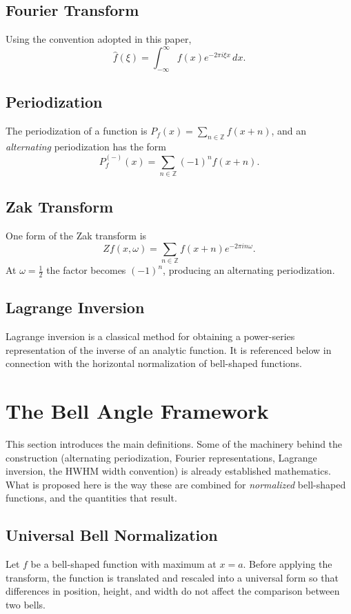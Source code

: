 \documentclass[11pt]{article}
\theoremstyle{definition}
\theoremstyle{plain}
\theoremstyle{remark}
\begin{document}
\subsection{Fourier Transform}
Using the convention adopted in this paper,
\[
\widehat{f}(\xi)=\int_{-\infty}^{\infty}f(x)e^{-2\pi i\xi x}\,dx .
\]

\subsection{Periodization}
The periodization of a function is $P_f(x)=\sum_{n\in\mathbb Z}f(x+n)$, and an
\emph{alternating} periodization has the form
\[
P_f^{(-)}(x)=\sum_{n\in\mathbb Z}(-1)^n f(x+n).
\]

\subsection{Zak Transform}
One form of the Zak transform is
\[
Zf(x,\omega)=\sum_{n\in\mathbb Z}f(x+n)e^{-2\pi i n\omega}.
\]
At $\omega=\frac12$ the factor becomes $(-1)^n$, producing an alternating periodization.

\subsection{Lagrange Inversion}
Lagrange inversion is a classical method for obtaining a power-series representation of
the inverse of an analytic function. It is referenced below in connection with the
horizontal normalization of bell-shaped functions.

 
\section{The Bell Angle Framework}
 

This section introduces the main definitions. Some of the machinery behind the
construction (alternating periodization, Fourier representations, Lagrange inversion,
the HWHM width convention) is already established mathematics. What is proposed here
is the way these are combined for \emph{normalized} bell-shaped functions, and the
quantities that result.

\subsection{Universal Bell Normalization}

Let $f$ be a bell-shaped function with maximum at $x=a$. Before applying the transform,
the function is translated and rescaled into a universal form so that differences in
position, height, and width do not affect the comparison between two bells.
\end{document}

